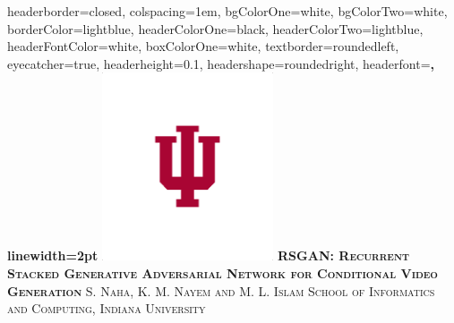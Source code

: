 \documentclass[landscape,a0paper,fontscale=0.285]{baposter} %
\begin{document}
\begin{poster}
{
headerborder=closed, %
colspacing=1em, %
bgColorOne=white, %
bgColorTwo=white, %
borderColor=lightblue, %
headerColorOne=black, %
headerColorTwo=lightblue, %
headerFontColor=white, %
boxColorOne=white, %
textborder=roundedleft, %
eyecatcher=true, %
headerheight=0.1\textheight, %
headershape=roundedright, %
headerfont=\Large\bf\textsc, %
linewidth=2pt %
}
%
{\includegraphics[height=15em]{iu_trident_cmyk_crimson}} %
{\hspace*{-1em} \bf\textsc{RSGAN: Recurrent Stacked Generative Adversarial
Network for Conditional Video Generation}\vspace{0.5em}} %
{\textsc{S. Naha, K. M. Nayem and M. L. Islam \hspace{12pt} School of Informatics and Computing, Indiana University}} %


\end{poster}
\end{document}
